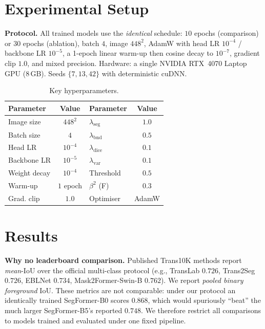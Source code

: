 \documentclass[conference]{IEEEtran}
\newcommand{\iou}{IoU}
\begin{document}
\section{Experimental Setup}
\textbf{Protocol.} All trained models use the \emph{identical} schedule: $10$
epochs (comparison) or $30$ epochs (ablation), batch $4$, image $448^2$, AdamW
\cite{loshchilov2019adamw} with head LR $10^{-4}$ / backbone LR $10^{-5}$, a
1-epoch linear warm-up then cosine decay \cite{loshchilov2017sgdr} to $10^{-7}$,
gradient clip $1.0$, and mixed precision. Hardware: a single NVIDIA RTX~4070
Laptop GPU (8\,GB). Seeds $\{7,13,42\}$ with deterministic cuDNN.

\begin{table}[t]
\centering
\caption{Key hyperparameters.}
\label{tab:hparams}
\begin{tabular}{lc@{\hskip 1.4em}lc}
\toprule
Parameter & Value & Parameter & Value \\
\midrule
Image size & $448^2$ & $\lambda_{\mathrm{seg}}$ & $1.0$ \\
Batch size & $4$ & $\lambda_{\mathrm{bnd}}$ & $0.5$ \\
Head LR & $10^{-4}$ & $\lambda_{\mathrm{dice}}$ & $0.1$ \\
Backbone LR & $10^{-5}$ & $\lambda_{\mathrm{var}}$ & $0.1$ \\
Weight decay & $10^{-4}$ & Threshold & $0.5$ \\
Warm-up & $1$ epoch & $\beta^2$ (F) & $0.3$ \\
Grad. clip & $1.0$ & Optimiser & AdamW \\
\bottomrule
\end{tabular}
\end{table}

\section{Results}
\label{sec:results}
\textbf{Why no leaderboard comparison.} Published Trans10K methods report
\emph{mean}-\iou{} over the official multi-class protocol (e.g., TransLab
$0.726$, Trans2Seg $0.726$, EBLNet $0.734$, Mask2Former-Swin-B $0.762$). We
report \emph{pooled binary foreground} \iou. These metrics are not comparable:
under our protocol an identically trained SegFormer-B0 scores $0.868$, which
would spuriously ``beat'' the much larger SegFormer-B5's reported $0.748$. We
therefore restrict all comparisons to models trained and evaluated under one
fixed pipeline.
\end{document}
